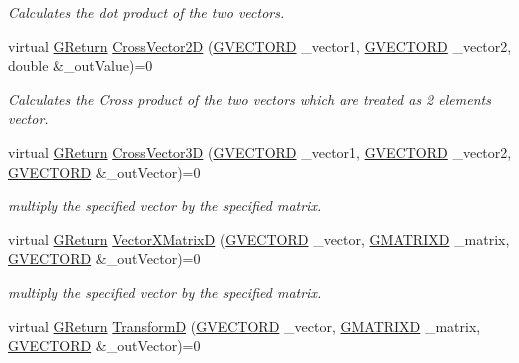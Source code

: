 \begin{DoxyCompactItemize}
\begin{DoxyCompactList}\small\item\em Calculates the dot product of the two vectors. \end{DoxyCompactList}\item 
virtual \mbox{\hyperlink{namespaceGW_a67a839e3df7ea8a5c5686613a7a3de21}{G\+Return}} \mbox{\hyperlink{classGW_1_1MATH_1_1GVector_a96ef18a518dfbdbda5727e7799844b15}{Cross\+Vector2D}} (\mbox{\hyperlink{structGW_1_1MATH_1_1GVECTORD}{G\+V\+E\+C\+T\+O\+RD}} \+\_\+vector1, \mbox{\hyperlink{structGW_1_1MATH_1_1GVECTORD}{G\+V\+E\+C\+T\+O\+RD}} \+\_\+vector2, double \&\+\_\+out\+Value)=0
\begin{DoxyCompactList}\small\item\em Calculates the Cross product of the two vectors which are treated as 2 elements vector. \end{DoxyCompactList}\item 
virtual \mbox{\hyperlink{namespaceGW_a67a839e3df7ea8a5c5686613a7a3de21}{G\+Return}} \mbox{\hyperlink{classGW_1_1MATH_1_1GVector_a3556471c23dbd6d8a7e44960153f1dae}{Cross\+Vector3D}} (\mbox{\hyperlink{structGW_1_1MATH_1_1GVECTORD}{G\+V\+E\+C\+T\+O\+RD}} \+\_\+vector1, \mbox{\hyperlink{structGW_1_1MATH_1_1GVECTORD}{G\+V\+E\+C\+T\+O\+RD}} \+\_\+vector2, \mbox{\hyperlink{structGW_1_1MATH_1_1GVECTORD}{G\+V\+E\+C\+T\+O\+RD}} \&\+\_\+out\+Vector)=0
\begin{DoxyCompactList}\small\item\em multiply the specified vector by the specified matrix. \end{DoxyCompactList}\item 
virtual \mbox{\hyperlink{namespaceGW_a67a839e3df7ea8a5c5686613a7a3de21}{G\+Return}} \mbox{\hyperlink{classGW_1_1MATH_1_1GVector_a07512cdb954882137d3e39d3b23e20de}{Vector\+X\+MatrixD}} (\mbox{\hyperlink{structGW_1_1MATH_1_1GVECTORD}{G\+V\+E\+C\+T\+O\+RD}} \+\_\+vector, \mbox{\hyperlink{structGW_1_1MATH_1_1GMATRIXD}{G\+M\+A\+T\+R\+I\+XD}} \+\_\+matrix, \mbox{\hyperlink{structGW_1_1MATH_1_1GVECTORD}{G\+V\+E\+C\+T\+O\+RD}} \&\+\_\+out\+Vector)=0
\begin{DoxyCompactList}\small\item\em multiply the specified vector by the specified matrix. \end{DoxyCompactList}\item 
virtual \mbox{\hyperlink{namespaceGW_a67a839e3df7ea8a5c5686613a7a3de21}{G\+Return}} \mbox{\hyperlink{classGW_1_1MATH_1_1GVector_a7930e1cb3b872c73af46d4ce30264b99}{TransformD}} (\mbox{\hyperlink{structGW_1_1MATH_1_1GVECTORD}{G\+V\+E\+C\+T\+O\+RD}} \+\_\+vector, \mbox{\hyperlink{structGW_1_1MATH_1_1GMATRIXD}{G\+M\+A\+T\+R\+I\+XD}} \+\_\+matrix, \mbox{\hyperlink{structGW_1_1MATH_1_1GVECTORD}{G\+V\+E\+C\+T\+O\+RD}} \&\+\_\+out\+Vector)=0

\end{DoxyCompactItemize}
